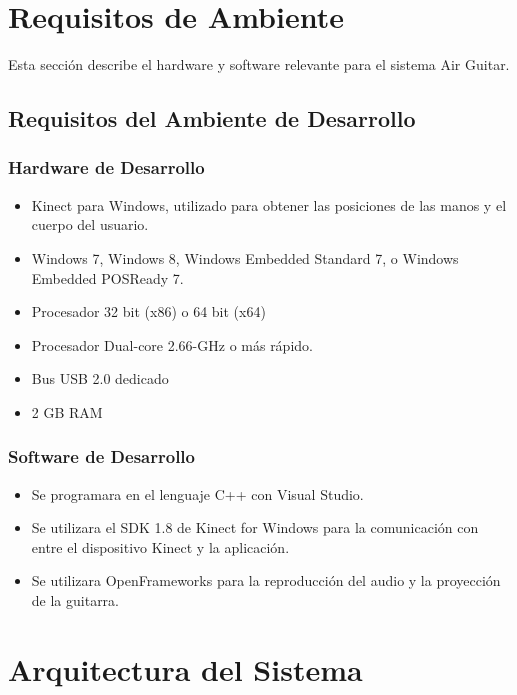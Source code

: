 \documentclass[a4paper,12pt]{article}
\begin{document}
\newpage
\section{Requisitos de Ambiente}
Esta sección describe el hardware y software relevante para el sistema Air
Guitar.
\subsection{Requisitos del Ambiente de Desarrollo}
\subsubsection{Hardware de Desarrollo}
\label{subsubsec:hardware}

\begin{itemize}
        \item Kinect para Windows, utilizado para obtener las posiciones de las
                manos y el cuerpo del usuario.
        \item Windows 7, Windows 8, Windows Embedded Standard 7, o Windows
                Embedded POSReady 7.
        \item Procesador 32 bit (x86) o 64 bit (x64) 
        \item Procesador Dual-core 2.66-GHz o más rápido. 
        \item Bus USB 2.0 dedicado
        \item 2 GB RAM
\end{itemize}

\subsubsection{Software de Desarrollo}
\label{subsubsec:software}

\begin{itemize}
	\item Se programara en el lenguaje C++ con Visual Studio.
	\item Se utilizara el SDK 1.8 de Kinect for Windows para la comunicación con entre el dispositivo Kinect y la aplicación. 
	\item Se utilizara OpenFrameworks para la reproducción del audio y la proyección de la guitarra.
\end{itemize}

\section{Arquitectura del Sistema}
\end{document}
